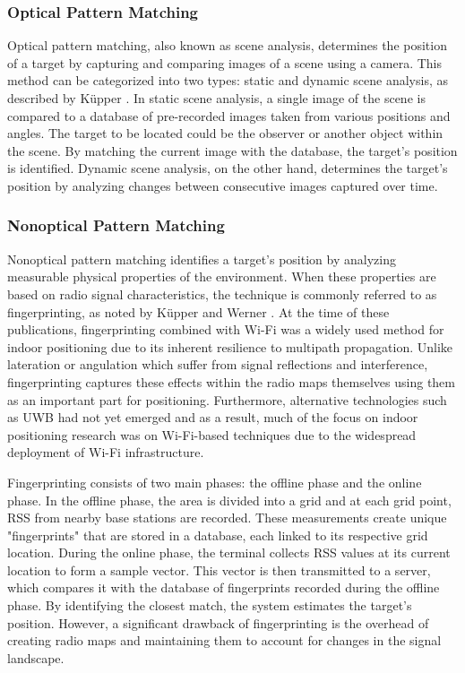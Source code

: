 \subsubsection{Optical Pattern Matching}
Optical pattern matching, also known as scene analysis, determines the position of a target by capturing and comparing images of a scene using a camera.
This method can be categorized into two types: static and dynamic scene analysis, as described by Küpper \cite{kupper2005location}.
In static scene analysis, a single image of the scene is compared to a database of pre-recorded images taken from various positions and angles. 
The target to be located could be the observer or another object within the scene. 
By matching the current image with the database, the target's position is identified.
Dynamic scene analysis, on the other hand, determines the target's position by analyzing changes between consecutive images captured over time. 

\subsubsection{Nonoptical Pattern Matching}
\label{sec:fingerprinting}
Nonoptical pattern matching identifies a target's position by analyzing measurable physical properties of the environment. 
When these properties are based on radio signal characteristics, the technique is commonly referred to as fingerprinting, as noted by Küpper \cite{kupper2005location} and Werner \cite{werner2014indoor}.
At the time of these publications, fingerprinting combined with \ac{Wi-Fi} was a widely used method for indoor positioning due to its inherent resilience to multipath propagation.
Unlike lateration or angulation which suffer from signal reflections and interference, fingerprinting captures these effects within the radio maps themselves using them as an important part for positioning.
Furthermore, alternative technologies such as \ac{UWB} had not yet emerged and as a result, much of the focus on indoor positioning research was on \acs{Wi-Fi}-based techniques due to the widespread deployment of \acs{Wi-Fi} infrastructure.

Fingerprinting consists of two main phases: the offline phase and the online phase. 
In the offline phase, the area is divided into a grid and at each grid point, \acs{RSS} from nearby base stations are recorded. 
These measurements create unique "fingerprints" that are stored in a database, each linked to its respective grid location.
During the online phase, the terminal collects \acs{RSS} values at its current location to form a sample vector. This vector is then transmitted to a server, which compares it with the database of fingerprints recorded during the offline phase. 
By identifying the closest match, the system estimates the target's position.
However, a significant drawback of fingerprinting is the overhead of creating radio maps and maintaining them to account for changes in the signal landscape.

